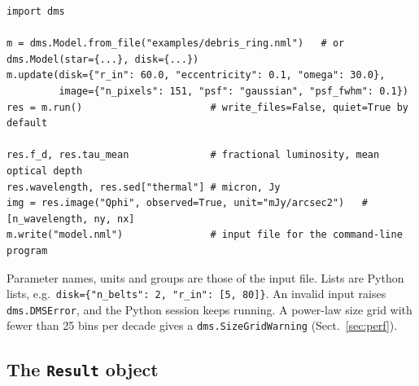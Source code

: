 \documentclass[11pt,a4paper]{article}
\newcommand{\code}[1]{\texttt{#1}}
\begin{document}
\begin{lstlisting}[style=py]
import dms

m = dms.Model.from_file("examples/debris_ring.nml")   # or dms.Model(star={...}, disk={...})
m.update(disk={"r_in": 60.0, "eccentricity": 0.1, "omega": 30.0},
         image={"n_pixels": 151, "psf": "gaussian", "psf_fwhm": 0.1})
res = m.run()                      # write_files=False, quiet=True by default

res.f_d, res.tau_mean              # fractional luminosity, mean optical depth
res.wavelength, res.sed["thermal"] # micron, Jy
img = res.image("Qphi", observed=True, unit="mJy/arcsec2")   # [n_wavelength, ny, nx]
m.write("model.nml")               # input file for the command-line program
\end{lstlisting}

Parameter names, units and groups are those of the input file. Lists are Python lists, e.g.\
\code{disk=\{"n\_belts": 2, "r\_in": [5, 80]\}}. An invalid input raises \code{dms.DMSError}, and
the Python session keeps running. A power-law size grid with fewer than 25 bins per decade gives a
\code{dms.SizeGridWarning} (Sect.~\ref{sec:perf}).

\subsection{The \code{Result} object}
\end{document}
